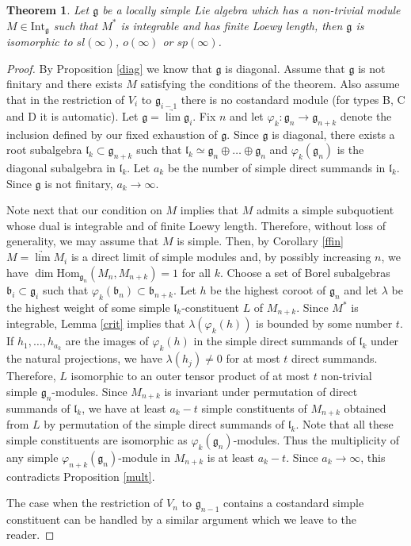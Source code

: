 \documentclass{birkmult}
\newcounter{theorem}
\newtheorem{theo}{Theorem}[section]
\renewcommand{\gg}{\mathfrak{g}}
\renewcommand{\ll}{\mathfrak{l}}
\renewcommand {\phi} {\varphi}
\newcommand{\Int}{\mathrm{Int}}
\renewcommand{\hom}{\mathrm{Hom}}
\begin{document}
\begin{theo}\label{fin} Let $\gg$ be a locally simple Lie algebra which has a
  non-trivial module $M\in\Int_\gg$ such that $M^*$ is integrable and has finite
  Loewy length, then $\gg$ is isomorphic to $sl(\infty)$, $o(\infty)$
  or $sp(\infty)$.
\end{theo}
\begin{proof} By Proposition \ref{diag} we know that $\gg$ is diagonal.
Assume that $\gg$ is not finitary and there exists $M$ satisfying
the conditions of the theorem. Also assume that in the restriction
of $V_i$ to $\gg_{i-1}$ there is no costandard module (for types
B, C and D it is automatic). Let
$\gg=\underrightarrow{\lim}\gg_i$. Fix $n$ and let
$\phi_k:\gg_n\to \gg_{n+k}$ denote the inclusion defined by our
fixed exhaustion of $\gg$. Since $\gg$ is diagonal, there exists a
root subalgebra $\ll_k\subset\gg_{n+k}$ such that $\ll_k\simeq
\gg_n\oplus\dots\oplus \gg_n$ and $\phi_k(\gg_n)$ is the diagonal
subalgebra in $\ll_k$. Let $a_k$ be the number of simple direct
summands in $\ll_k$. Since $\gg$ is not finitary, $a_k\to\infty$.

Note next that our condition on $M$ implies that $M$ admits a simple subquotient whose dual is
integrable and of finite Loewy length. Therefore, without loss of
generality, we may assume that $M$ is simple. Then, by
Corollary \ref{ffin} $M=\underrightarrow{\lim}M_i$ is a direct
limit of simple modules and, by possibly increasing $n$, we have
$\dim\hom_{\gg_n}(M_n,M_{n+k})=1$ for all $k$. Choose a set of
Borel subalgebras $\mathfrak b_i\subset \gg_i$ such that
$\phi_k(\mathfrak b_n)\subset \mathfrak b_{n+k}$. Let $h$ be the
highest coroot of $\gg_n$ and let $\lambda$ be the highest weight
of some simple $\ll_k$-constituent $L$ of $M_{n+k}$. Since $M^*$
is integrable, Lemma \ref{crit} implies that $\lambda(\phi_k(h))$
is bounded by some number $t$. If $h_1,\dots,h_{a_k}$ are the
images of $\phi_k(h)$ in the simple direct summands of $\ll_k$
under the natural projections, we have $\lambda(h_j)\neq 0$ for at
most $t$ direct summands. Therefore, $L$ isomorphic to an outer
tensor product of at most $t$ non-trivial simple $\gg_n$-modules.
Since $M_{n+k}$ is invariant under permutation of direct summands
of $\ll_k$, we have at least $a_k-t$ simple constituents of
$M_{n+k}$ obtained from $L$ by permutation of the simple direct
summands of $\ll_k$. Note that all these simple constituents are
isomorphic as $\phi_k(\gg_n)$-modules. Thus the multiplicity of
any simple $\phi_{n+k}(\gg_n)$-module in $M_{n+k}$ is at least
$a_k-t$. Since $a_k\to\infty$, this contradicts Proposition
\ref{mult}.

The case when the restriction of $V_n$ to $\gg_{n-1}$ contains a
costandard simple constituent can be handled by a similar argument
which we leave to the reader.
\end{proof}
\end{document}
